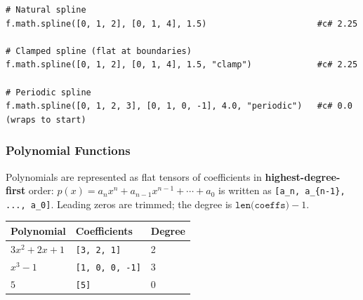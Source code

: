 \begin{verbatim}
# Natural spline
f.math.spline([0, 1, 2], [0, 1, 4], 1.5)                      #c# 2.25

# Clamped spline (flat at boundaries)
f.math.spline([0, 1, 2], [0, 1, 4], 1.5, "clamp")             #c# 2.25

# Periodic spline
f.math.spline([0, 1, 2, 3], [0, 1, 0, -1], 4.0, "periodic")   #c# 0.0 (wraps to start)
\end{verbatim}

\subsubsection{Polynomial Functions}

Polynomials are represented as flat tensors of coefficients in \textbf{highest-degree-first} order: $p(x) = a_n x^n + a_{n-1} x^{n-1} + \cdots + a_0$ is written as \texttt{[a\_n, a\_\{n-1\}, ..., a\_0]}. Leading zeros are trimmed; the degree is $\texttt{len(coeffs)} - 1$.

\begin{center}
\begin{tabular}{|l|l|l|}
\hline
\textbf{Polynomial} & \textbf{Coefficients} & \textbf{Degree} \\
\hline
$3x^2 + 2x + 1$ & \texttt{[3, 2, 1]} & 2 \\
$x^3 - 1$ & \texttt{[1, 0, 0, -1]} & 3 \\
$5$ & \texttt{[5]} & 0 \\
\hline
\end{tabular}
\end{center}

